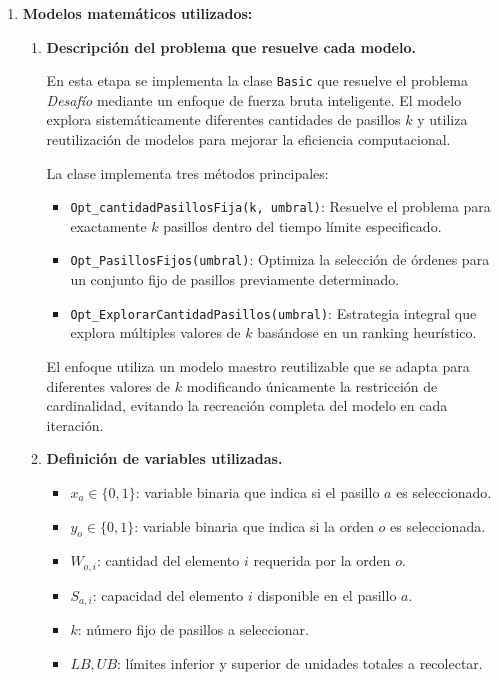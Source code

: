 \documentclass[a4paper,12pt]{article}
\begin{document}
\begin{enumerate}[label=(\alph*), leftmargin=2em]
    \item \textbf{Modelos matemáticos utilizados:}
    \begin{enumerate}[label=\roman*., leftmargin=0.2em]
        \item \textbf{Descripción del problema que resuelve cada modelo.}

            En esta etapa se implementa la clase \texttt{Basic} que resuelve el problema \textit{Desafío} mediante un enfoque de fuerza bruta inteligente. El modelo explora sistemáticamente diferentes cantidades de pasillos $k$ y utiliza reutilización de modelos para mejorar la eficiencia computacional.

            La clase implementa tres métodos principales:
            \begin{itemize}
                \item \texttt{Opt\_cantidadPasillosFija(k, umbral)}: Resuelve el problema para exactamente $k$ pasillos dentro del tiempo límite especificado.
                \item \texttt{Opt\_PasillosFijos(umbral)}: Optimiza la selección de órdenes para un conjunto fijo de pasillos previamente determinado.
                \item \texttt{Opt\_ExplorarCantidadPasillos(umbral)}: Estrategia integral que explora múltiples valores de $k$ basándose en un ranking heurístico.
            \end{itemize}

            El enfoque utiliza un modelo maestro reutilizable que se adapta para diferentes valores de $k$ modificando únicamente la restricción de cardinalidad, evitando la recreación completa del modelo en cada iteración.

        \item \textbf{Definición de variables utilizadas.}

            \begin{itemize}
                \item $x_a \in \{0,1\}$: variable binaria que indica si el pasillo $a$ es seleccionado.
                \item $y_o \in \{0,1\}$: variable binaria que indica si la orden $o$ es seleccionada.
                \item $W_{o,i}$: cantidad del elemento $i$ requerida por la orden $o$.
                \item $S_{a,i}$: capacidad del elemento $i$ disponible en el pasillo $a$.
                \item $k$: número fijo de pasillos a seleccionar.
                \item $LB, UB$: límites inferior y superior de unidades totales a recolectar.
            \end{itemize}


\end{enumerate}
\end{enumerate}
\end{document}
